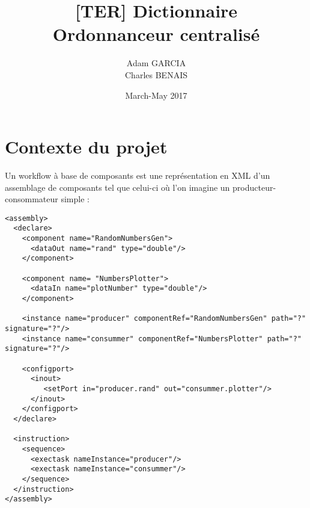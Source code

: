 \documentclass{article}
\title{[TER] Dictionnaire \\
Ordonnanceur centralisé}
\author{Adam GARCIA \\
        Charles BENAIS}
\date{March-May 2017}
\begin{document}
\maketitle
\pagebreak
\tableofcontents


\pagebreak

\part{Contexte du projet}
Un workflow à base de composants est une représentation en XML d'un assemblage de composants tel que celui-ci où l'on imagine un producteur-consommateur simple :
\begin{verbatim}
<assembly>
  <declare>
    <component name="RandomNumbersGen">
      <dataOut name="rand" type="double"/>
    </component>

    <component name= "NumbersPlotter">
      <dataIn name="plotNumber" type="double"/>
    </component>

    <instance name="producer" componentRef="RandomNumbersGen" path="?" signature="?"/>
    <instance name="consummer" componentRef="NumbersPlotter" path="?" signature="?"/>

    <configport>
      <inout>
         <setPort in="producer.rand" out="consummer.plotter"/>
      </inout>
    </configport>
  </declare>

  <instruction>
    <sequence>
      <exectask nameInstance="producer"/>
      <exectask nameInstance="consummer"/>
    </sequence>
  </instruction>
</assembly>
\end{verbatim}


\newpage
\end{document}
